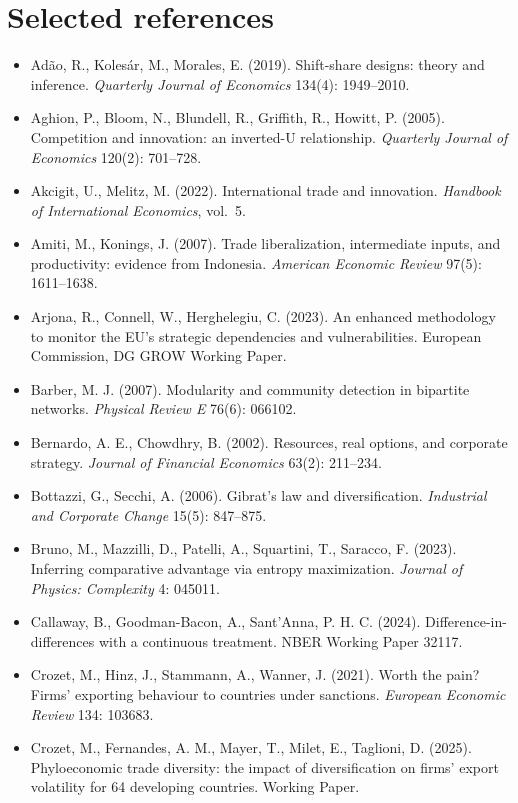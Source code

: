 \documentclass[11pt]{article}
\begin{document}
\section*{Selected references}
\footnotesize
\begin{itemize}[leftmargin=1.4em,labelsep=0.4em]\raggedright
  \item Ad\~ao, R., Koles\'ar, M., Morales, E. (2019). Shift-share designs: theory and inference. \emph{Quarterly Journal of Economics} 134(4): 1949--2010.
  \item Aghion, P., Bloom, N., Blundell, R., Griffith, R., Howitt, P. (2005). Competition and innovation: an inverted-U relationship. \emph{Quarterly Journal of Economics} 120(2): 701--728.
  \item Akcigit, U., Melitz, M. (2022). International trade and innovation. \emph{Handbook of International Economics}, vol.~5.
  \item Amiti, M., Konings, J. (2007). Trade liberalization, intermediate inputs, and productivity: evidence from Indonesia. \emph{American Economic Review} 97(5): 1611--1638.
  \item Arjona, R., Connell, W., Herghelegiu, C. (2023). An enhanced methodology to monitor the EU's strategic dependencies and vulnerabilities. European Commission, DG GROW Working Paper.
  \item Barber, M. J. (2007). Modularity and community detection in bipartite networks. \emph{Physical Review E} 76(6): 066102.
  \item Bernardo, A. E., Chowdhry, B. (2002). Resources, real options, and corporate strategy. \emph{Journal of Financial Economics} 63(2): 211--234.
  \item Bottazzi, G., Secchi, A. (2006). Gibrat's law and diversification. \emph{Industrial and Corporate Change} 15(5): 847--875.
  \item Bruno, M., Mazzilli, D., Patelli, A., Squartini, T., Saracco, F. (2023). Inferring comparative advantage via entropy maximization. \emph{Journal of Physics: Complexity} 4: 045011.
  \item Callaway, B., Goodman-Bacon, A., Sant'Anna, P. H. C. (2024). Difference-in-differences with a continuous treatment. NBER Working Paper 32117.
  \item Crozet, M., Hinz, J., Stammann, A., Wanner, J. (2021). Worth the pain? Firms' exporting behaviour to countries under sanctions. \emph{European Economic Review} 134: 103683.
  \item Crozet, M., Fernandes, A. M., Mayer, T., Milet, E., Taglioni, D. (2025). Phyloeconomic trade diversity: the impact of diversification on firms' export volatility for 64 developing countries. Working Paper.

\end{itemize}
\end{document}
